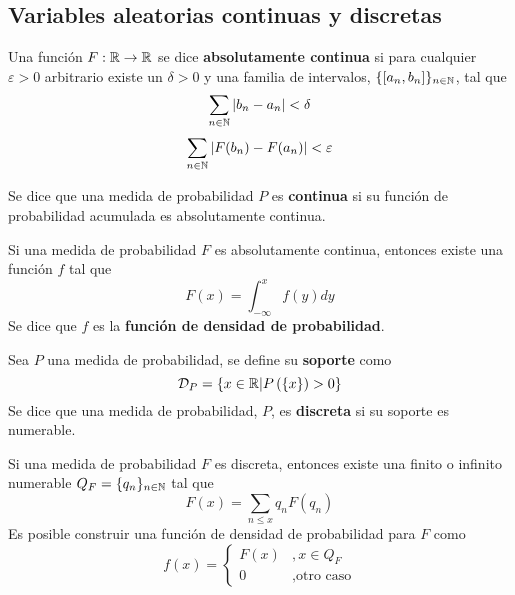 
\subsection{Variables aleatorias continuas y discretas}

\begin{definicion}
Una función $F: \mathbb{R} \rightarrow \mathbb{R}$ se dice \textbf{absolutamente continua} si para cualquier $\varepsilon>0$ arbitrario existe un $\delta>0$ y una familia de intervalos, $\{ [a_n, b_n]\}_{n\in \mathbb{N}}$, tal que
\begin{equation}
\sum_{n\in \mathbb{N}} \left| b_n - a_n \right| < \delta 
\end{equation}
\begin{equation}
\sum_{n\in \mathbb{N}} \left| F(b_n) - F(a_n) \right| < \varepsilon 
\end{equation}
\end{definicion}

Se dice que una medida de probabilidad $P$ es \textbf{continua} si su función de probabilidad acumulada es absolutamente continua.

Si una medida de probabilidad $F$ es absolutamente continua, entonces existe una función $f$ tal que 
\begin{equation}
F(x) = \int_{-\infty}^{x}f(y) dy
\end{equation}
Se dice que $f$ es la \textbf{función de densidad de probabilidad}.

Sea $P$ una medida de probabilidad, se define su \textbf{soporte} como
\begin{equation}
\mathcal{D}_P = \left\{ x\in \mathbb{R} \lvert P\left( \left\{ x\right\} \right)>0 \right\}
\end{equation}
%
Se dice que una medida de probabilidad, $P$, es \textbf{discreta} si su soporte es numerable.

Si una medida de probabilidad $F$ es discreta, entonces existe una finito o infinito numerable $Q_F=\{q_n\}_{n\in \mathbb{N}}$ tal que 
\begin{equation}
F(x) = \sum_{n\leq x} q_n F({q_n})
\end{equation}
Es posible construir una función de densidad de probabilidad para $F$ como
\begin{equation}
f(x) = \begin{cases}
F({x}) &, x\in Q_F \\
0 &, \text{otro caso}
\end{cases}
\end{equation}

